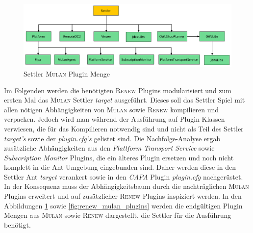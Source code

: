 	\begin{figure}[h!]
	  \centering
	  \includegraphics[width=\textwidth]{material/images/settler-mulan-plugins.pdf}
	  \caption{Settler \textsc{Mulan} Plugin Menge}
	  \label{fig:settler_mulan_plugins}
	\end{figure}

	Im Folgenden werden die benötigten \textsc{Renew} Plugins modularisiert und zum ersten Mal das \textsc{Mulan} Settler \textit{target} ausgeführt. Dieses soll das Settler Spiel mit allen nötigen Abhängigkeiten von \textsc{Mulan} sowie \textsc{Renew} kompilieren und verpacken. Jedoch wird man während der Ausführung auf Plugin Klassen verwiesen, die für das Kompilieren notwendig sind und nicht als Teil des Settler \textit{target's} sowie der \textit{plugin.cfg's} gelistet sind. \newline
	Die Nachfolge-Analyse ergab zusätzliche Abhängigkeiten aus den \textit{Plattform Transport Service} sowie \textit{Subscription Monitor} Plugins, die ein älteres Plugin ersetzen und noch nicht komplett in die Ant Umgebung eingebunden sind. Daher werden diese in den Settler Ant \textit{target} verankert sowie in den \textit{CAPA} Plugin \textit{plugin.cfg} nachgerüstet. In der Konsequenz muss der Abhängigkeitsbaum durch die nachträglichen \textsc{Mulan} Plugins erweitert und auf zusätzlicher \textsc{Renew} Plugins inspiziert werden. \newline
	In den Abbildungen \ref{fig:settler_mulan_plugins} sowie \ref{fig:renew_mulan_plugins} werden die endgültigen Plugin Mengen aus \textsc{Mulan} sowie \textsc{Renew} dargestellt, die Settler für die Ausführung benötigt. \bigbreak

